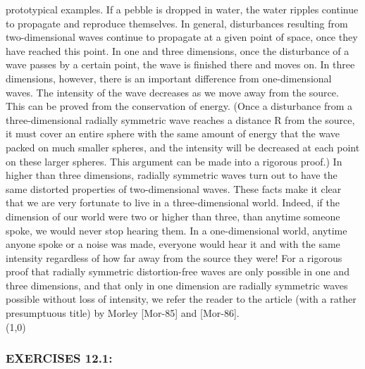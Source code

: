 \documentclass[../main.tex]{subfiles}
\begin{document}
{{prototypical examples. If a pebble is dropped in water, the water ripples continue 
to propagate and reproduce themselves. In general, disturbances resulting from two-dimensional waves continue to propagate at a given point of space, once they 
have reached this point. In one and three dimensions, once the disturbance of a 
wave passes by a certain point, the wave is finished there and moves on. In three 
dimensions, however, there is an important difference from one-dimensional 
waves. The intensity of the wave decreases as we move away from the source. 
This can be proved from the conservation of energy. (Once a disturbance from a 
three-dimensional radially symmetric wave reaches a distance R from the source, 
it must cover an entire sphere with the same amount of energy that the wave 
packed on much smaller spheres, and the intensity will be decreased at each point 
on these larger spheres. This argument can be made into a rigorous proof.) In 
higher than three dimensions, radially symmetric waves turn out to have the same 
distorted properties of two-dimensional waves. These facts make it clear that we 
are very fortunate to live in a three-dimensional world. Indeed, if the dimension of 
our world were two or higher than three, than anytime someone spoke, we would 
never stop hearing them. In a one-dimensional world, anytime anyone spoke or a 
noise was made, everyone would hear it and with the same intensity regardless of 
how far away from the source they were! For a rigorous proof that radially 
symmetric distortion-free waves are only possible in one and three dimensions, 
and that only in one dimension are radially symmetric waves possible without loss 
of intensity, we refer the reader to the article (with a rather presumptuous title) by 
Morley [Mor-85] and [Mor-86].  
\\
\line(1,0){\textwidth}
\subsubsection{EXERCISES 12.1:}


}}
\end{document}
